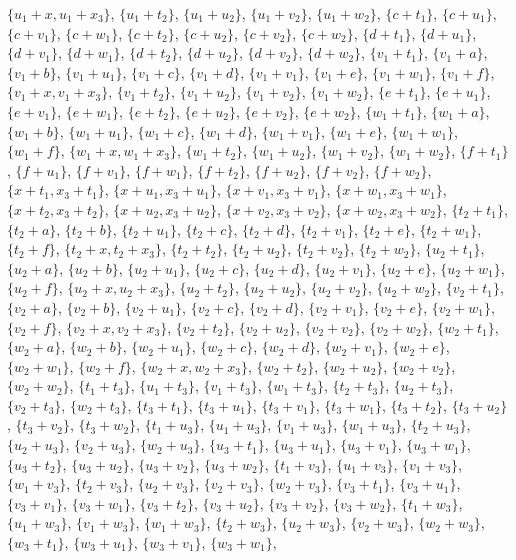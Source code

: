 \begin{itemize}
$\{u_1 + x, u_1 + x_3\}$, $\{u_1 + t_2\}$, $\{u_1 + u_2\}$, $\{u_1 + v_2\}$, $\{u_1 + w_2\}$, $\{c + t_1\}$, $\{c + u_1\}$, $\{c + v_1\}$, $\{c + w_1\}$, $\{c + t_2\}$, $\{c + u_2\}$, $\{c + v_2\}$, $\{c + w_2\}$, $\{d + t_1\}$, $\{d + u_1\}$, $\{d + v_1\}$, $\{d + w_1\}$, $\{d + t_2\}$, $\{d + u_2\}$, $\{d + v_2\}$, $\{d + w_2\}$, $\{v_1 + t_1\}$, $\{v_1 + a\}$, $\{v_1 + b\}$, $\{v_1 + u_1\}$, $\{v_1 + c\}$, $\{v_1 + d\}$, $\{v_1 + v_1\}$, $\{v_1 + e\}$, $\{v_1 + w_1\}$, $\{v_1 + f\}$, $\{v_1 + x, v_1 + x_3\}$, $\{v_1 + t_2\}$, $\{v_1 + u_2\}$, $\{v_1 + v_2\}$, $\{v_1 + w_2\}$, $\{e + t_1\}$, $\{e + u_1\}$, $\{e + v_1\}$, $\{e + w_1\}$, $\{e + t_2\}$, $\{e + u_2\}$, $\{e + v_2\}$, $\{e + w_2\}$, $\{w_1 + t_1\}$, $\{w_1 + a\}$, $\{w_1 + b\}$, $\{w_1 + u_1\}$, $\{w_1 + c\}$, $\{w_1 + d\}$, $\{w_1 + v_1\}$, $\{w_1 + e\}$, $\{w_1 + w_1\}$, $\{w_1 + f\}$, $\{w_1 + x, w_1 + x_3\}$, $\{w_1 + t_2\}$, $\{w_1 + u_2\}$, $\{w_1 + v_2\}$, $\{w_1 + w_2\}$, $\{f + t_1\}$, $\{f + u_1\}$, $\{f + v_1\}$, $\{f + w_1\}$, $\{f + t_2\}$, $\{f + u_2\}$, $\{f + v_2\}$, $\{f + w_2\}$, $\{x + t_1, x_3 + t_1\}$, $\{x + u_1, x_3 + u_1\}$, $\{x + v_1, x_3 + v_1\}$, $\{x + w_1, x_3 + w_1\}$, $\{x + t_2, x_3 + t_2\}$, $\{x + u_2, x_3 + u_2\}$, $\{x + v_2, x_3 + v_2\}$, $\{x + w_2, x_3 + w_2\}$, $\{t_2 + t_1\}$, $\{t_2 + a\}$, $\{t_2 + b\}$, $\{t_2 + u_1\}$, $\{t_2 + c\}$, $\{t_2 + d\}$, $\{t_2 + v_1\}$, $\{t_2 + e\}$, $\{t_2 + w_1\}$, $\{t_2 + f\}$, $\{t_2 + x, t_2 + x_3\}$, $\{t_2 + t_2\}$, $\{t_2 + u_2\}$, $\{t_2 + v_2\}$, $\{t_2 + w_2\}$, $\{u_2 + t_1\}$, $\{u_2 + a\}$, $\{u_2 + b\}$, $\{u_2 + u_1\}$, $\{u_2 + c\}$, $\{u_2 + d\}$, $\{u_2 + v_1\}$, $\{u_2 + e\}$, $\{u_2 + w_1\}$, $\{u_2 + f\}$, $\{u_2 + x, u_2 + x_3\}$, $\{u_2 + t_2\}$, $\{u_2 + u_2\}$, $\{u_2 + v_2\}$, $\{u_2 + w_2\}$, $\{v_2 + t_1\}$, $\{v_2 + a\}$, $\{v_2 + b\}$, $\{v_2 + u_1\}$, $\{v_2 + c\}$, $\{v_2 + d\}$, $\{v_2 + v_1\}$, $\{v_2 + e\}$, $\{v_2 + w_1\}$, $\{v_2 + f\}$, $\{v_2 + x, v_2 + x_3\}$, $\{v_2 + t_2\}$, $\{v_2 + u_2\}$, $\{v_2 + v_2\}$, $\{v_2 + w_2\}$, $\{w_2 + t_1\}$, $\{w_2 + a\}$, $\{w_2 + b\}$, $\{w_2 + u_1\}$, $\{w_2 + c\}$, $\{w_2 + d\}$, $\{w_2 + v_1\}$, $\{w_2 + e\}$, $\{w_2 + w_1\}$, $\{w_2 + f\}$, $\{w_2 + x, w_2 + x_3\}$, $\{w_2 + t_2\}$, $\{w_2 + u_2\}$, $\{w_2 + v_2\}$, $\{w_2 + w_2\}$, $\{t_1 + t_3\}$, $\{u_1 + t_3\}$, $\{v_1 + t_3\}$, $\{w_1 + t_3\}$, $\{t_2 + t_3\}$, $\{u_2 + t_3\}$, $\{v_2 + t_3\}$, $\{w_2 + t_3\}$, $\{t_3 + t_1\}$, $\{t_3 + u_1\}$, $\{t_3 + v_1\}$, $\{t_3 + w_1\}$, $\{t_3 + t_2\}$, $\{t_3 + u_2\}$, $\{t_3 + v_2\}$, $\{t_3 + w_2\}$, $\{t_1 + u_3\}$, $\{u_1 + u_3\}$, $\{v_1 + u_3\}$, $\{w_1 + u_3\}$, $\{t_2 + u_3\}$, $\{u_2 + u_3\}$, $\{v_2 + u_3\}$, $\{w_2 + u_3\}$, $\{u_3 + t_1\}$, $\{u_3 + u_1\}$, $\{u_3 + v_1\}$, $\{u_3 + w_1\}$, $\{u_3 + t_2\}$, $\{u_3 + u_2\}$, $\{u_3 + v_2\}$, $\{u_3 + w_2\}$, $\{t_1 + v_3\}$, $\{u_1 + v_3\}$, $\{v_1 + v_3\}$, $\{w_1 + v_3\}$, $\{t_2 + v_3\}$, $\{u_2 + v_3\}$, $\{v_2 + v_3\}$, $\{w_2 + v_3\}$, $\{v_3 + t_1\}$, $\{v_3 + u_1\}$, $\{v_3 + v_1\}$, $\{v_3 + w_1\}$, $\{v_3 + t_2\}$, $\{v_3 + u_2\}$, $\{v_3 + v_2\}$, $\{v_3 + w_2\}$, $\{t_1 + w_3\}$, $\{u_1 + w_3\}$, $\{v_1 + w_3\}$, $\{w_1 + w_3\}$, $\{t_2 + w_3\}$, $\{u_2 + w_3\}$, $\{v_2 + w_3\}$, $\{w_2 + w_3\}$, $\{w_3 + t_1\}$, $\{w_3 + u_1\}$, $\{w_3 + v_1\}$, $\{w_3 + w_1\}$, 
\end{itemize}
